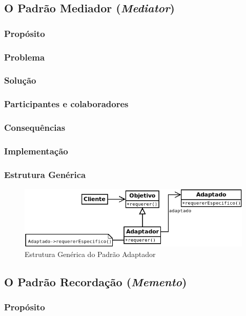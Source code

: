 \subsection{O Padrão Mediador (\textit{Mediator})}
\subsubsection{Propósito}
\subsubsection{Problema}
\subsubsection{Solução}
\subsubsection{Participantes e colaboradores}
\subsubsection{Consequências}
\subsubsection{Implementação}
\subsubsection{Estrutura Genérica}

\begin{figure}[h]
\begin{center}
\includegraphics[scale=0.6]{adaptador.png}
\caption{Estrutura Genérica do Padrão Adaptador}\label{fig:adaptador}
\end{center}
\end{figure}

\subsection{O Padrão Recordação (\textit{Memento})}
\subsubsection{Propósito}
